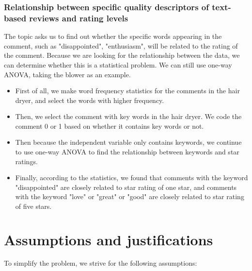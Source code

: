 \documentclass{mcmthesis}
\begin{document}
\subsubsection{Relationship between specific quality descriptors of text-based reviews and rating levels}
The topic asks us to find out whether the specific words appearing in the comment, such as "disappointed", "enthusiasm", will be related to the rating of the comment. Because we are looking for the relationship between the data, we can determine whether this is a statistical problem. We can still use one-way ANOVA, taking the blower as an example.
\begin{itemize}
	\item First of all, we make word frequency statistics for the comments in the hair dryer, and select the words with higher frequency.

	\item Then, we select the comment with key words in the hair dryer. We code the comment 0 or 1 based on whether it contains key words or not.
	
	\item Then because the independent variable only contains keywords, we continue to use one-way ANOVA to find the relationship between keywords and star ratings.
	
	\item Finally, according to the statistics, we found that
	comments with the keyword "disappointed" are closely related to star rating of one star, and comments with the keyword "love" or "great" or "good" are closely related to star rating of five stars.
\end{itemize}




\section{Assumptions and justifications}
To simplify the problem, we strive for the following assumptions:
\end{document}
